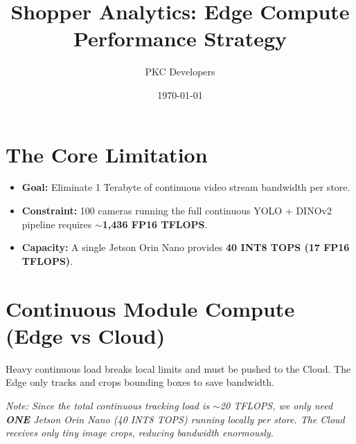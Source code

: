 \documentclass[12pt,a4paper]{article}
\title{Shopper Analytics: Edge Compute Performance Strategy}
\author{PKC Developers}
\date{\today}
\begin{document}
\maketitle

\section{The Core Limitation}
\begin{itemize}
    \item \textbf{Goal:} Eliminate 1 Terabyte of continuous video stream bandwidth per store.
    \item \textbf{Constraint:} 100 cameras running the full continuous YOLO + DINOv2 pipeline requires \textbf{$\sim$1,436 FP16 TFLOPS}.
    \item \textbf{Capacity:} A single Jetson Orin Nano provides \textbf{40 INT8 TOPS (17 FP16 TFLOPS)}.
\end{itemize}

\section{Continuous Module Compute (Edge vs Cloud)}
Heavy continuous load breaks local limits and must be pushed to the Cloud. The Edge only tracks and crops bounding boxes to save bandwidth.

\begin{table}[h!]
\centering
\small
{}
\caption{Continuous Module Compute. The Cloud only receives tiny image crops, reducing bandwidth enormously.}
\end{table}

\textit{Note: Since the total continuous tracking load is $\sim$20 TFLOPS, we only need \textbf{ONE} Jetson Orin Nano (40 INT8 TOPS) running locally per store. The Cloud receives only tiny image crops, reducing bandwidth enormously.}
\end{document}
